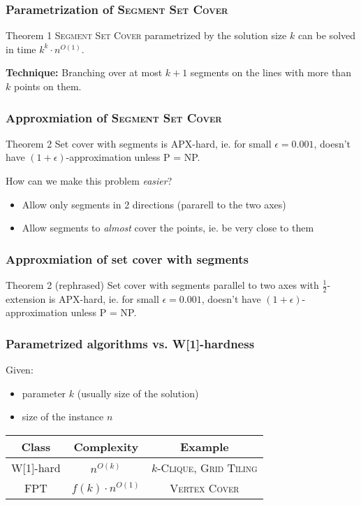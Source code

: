 \documentclass{beamer}
\begin{document}
\begin{frame}
\frametitle{Parametrization of \textsc{Segment Set Cover}}
\begin{block}{Theorem 1}
	\textsc{Segment Set Cover} parametrized by the solution size $k$
	can be solved in time $k^k \cdot n^{O(1)}$.
\end{block}

\textbf{Technique:} Branching over at most $k+1$
segments on the lines with more than $k$ points on them.
\end{frame}

\begin{frame}
\frametitle{Approxmiation of \textsc{Segment Set Cover}}
\begin{block}{Theorem 2}
	Set cover with segments is APX-hard, ie.\newline
	for small $\epsilon =0.001$,
	doesn't have $(1+\epsilon)$-approximation unless P = NP.
\end{block}

How can we make this problem \textit{easier}?
\begin{itemize}
\item Allow only segments in 2 directions (pararell to the two axes)
\item Allow segments to \textit{almost} cover the points, ie. be very
close to them
\end{itemize}

\end{frame}


\begin{frame}
\frametitle{Approxmiation of set cover with segments}
\begin{block}{Theorem 2 (rephrased)}
	Set cover with segments parallel to two axes with $\frac{1}{2}$-extension
	is APX-hard, ie.\newline
	for small $\epsilon =0.001$,
	doesn't have $(1+\epsilon)$-approximation unless P = NP.
\end{block}

\end{frame}


\begin{frame}
\frametitle{Parametrized algorithms vs. W[1]-hardness}
Given:
\begin{itemize}
\item parameter $k$ (usually size of the solution)
\item size of the instance $n$
\end{itemize}
\bigskip

\begin{tabular}{|c|c|c|}
\hline
\textbf{Class} & \textbf{Complexity} & \textbf{Example}\\
\hline
W[1]-hard & $n^{O(k)}$ & \textsc{$k$-Clique}, \textsc{Grid Tiling}\\
\hline
FPT & $f(k) \cdot n^{O(1)}$ & \textsc{Vertex Cover}\\
\hline
\end{tabular}

\end{frame}
\end{document}
